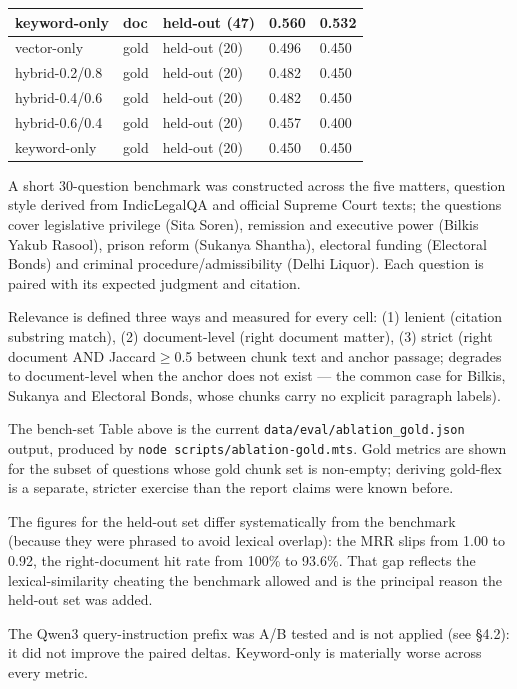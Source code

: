 \documentclass[12pt]{article}
\newcounter{procedure}
\begin{document}
\begin{table}[!htbp]
\begin{tabularx}{0.95\textwidth}{p{}p{}p{}p{}p{}}
keyword-only    & doc  & held-out (47) & 0.560 & 0.532 \\
\midrule
vector-only     & gold & held-out (20) & 0.496 & 0.450 \\
hybrid-0.2/0.8  & gold & held-out (20) & 0.482 & 0.450 \\
hybrid-0.4/0.6 & gold & held-out (20) & 0.482 & 0.450 \\
hybrid-0.6/0.4 & gold & held-out (20) & 0.457 & 0.400 \\
keyword-only    & gold & held-out (20) & 0.450 & 0.450 \\
\bottomrule
\end{tabularx}
\end{table}

A short 30-question benchmark was constructed across the five matters, question style derived from IndicLegalQA and official Supreme Court texts; the questions cover legislative privilege (Sita Soren), remission and executive power (Bilkis Yakub Rasool), prison reform (Sukanya Shantha), electoral funding (Electoral Bonds) and criminal procedure/admissibility (Delhi Liquor). Each question is paired with its expected judgment and citation.

Relevance is defined three ways and measured for every cell: (1) lenient (citation substring match), (2) document-level (right document matter), (3) strict (right document AND Jaccard$\ge$0.5 between chunk text and anchor passage; degrades to document-level when the anchor does not exist — the common case for Bilkis, Sukanya and Electoral Bonds, whose chunks carry no explicit paragraph labels).

The bench-set Table above is the current \texttt{data/eval/ablation\_gold.json} output, produced by \texttt{node scripts/ablation-gold.mts}. Gold metrics are shown for the subset of questions whose gold chunk set is non-empty; deriving gold-flex is a separate, stricter exercise than the report claims were known before.

The figures for the held-out set differ systematically from the benchmark (because they were phrased to avoid lexical overlap): the MRR slips from 1.00 to 0.92, the right-document hit rate from 100\% to 93.6\%. That gap reflects the lexical-similarity cheating the benchmark allowed and is the principal reason the held-out set was added.

The Qwen3 query-instruction prefix was A/B tested and is not applied (see \S4.2): it did not improve the paired deltas. Keyword-only is materially worse across every metric.
\end{document}
